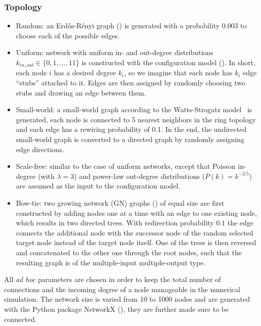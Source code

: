 \subsubsection{Topology}
\begin{itemize}
\item Random: an Erd\H{o}s-R\'enyi graph (\citealp{Erdos1959}) is generated with a probability
  $0.003$ to choose each of the possible edges.
\item Uniform: network with uniform in- and out-degree distributions $k_{in,out} \in 
  \{0,1,...,11\}$ is constructed 
  with the configuration model (\citealp{Newman2001}). 
  In short, each node $i$ has a desired degree $k_i$, 
  so we imagine that each node has $k_i$ edge ``stubs'' attached to it. Edges are 
  then assigned by randomly choosing two stubs and drawing an edge between them.
\item Small-world: a small-world graph  
according to the 
Watts-Strogatz model~\citep{Watts1998} is generated, 
each node is connected
to 5 nearest neighbors in the ring topology and each edge
has a rewiring probability of 0.1. In the end, the 
undirected small-world graph is converted to a directed
graph by randomly assigning edge directions.
\item Scale-free: similar to the case of uniform networks,
except that Poisson in-degree (with $\lambda = 3$) and power-law 
  out-degree distributions ($P(k) = k^{-2.5}$) are assumed as the input
  to the configuration model.
\item Bow-tie: two growing network (GN) graphs 
  (\citealp{Krapivsky2001}) of equal size are first 
  constructed by adding nodes one at a time with an edge to one existing node, 
  which results in two directed trees. With redirection probability $0.1$ the edge
  connects the additional node with the successor node of the random selected target
  node instead of the target node itself. One of the trees is then reversed and 
  concatenated to the other one through the root nodes, such that the resulting
  graph is of the multiple-input multiple-output type.
\end{itemize}
All \emph{ad hoc} parameters are chosen in order to keep the total number of connections
and the incoming degree of a node manageable in the numerical simulation.
The network size is varied from 10 to 1000 nodes and are generated with the Python package NetworkX 
(\citealp{Hagberg2008}), they are further made sure to be connected.

